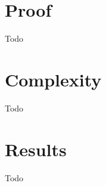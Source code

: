 \documentclass[conference]{IEEEtran}
\begin{document}
\section{Proof}

Todo
\section{Complexity}
Todo
\section{Results}
Todo
\end{document}
